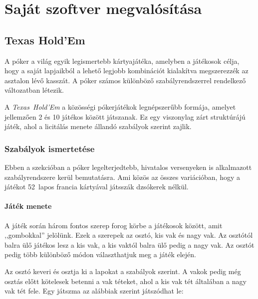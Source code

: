 \documentclass[]{thesis-ekf}
\theoremstyle{definition}
\theoremstyle{remark}
\begin{document}
\chapter{Saját szoftver megvalósítása}

\section{Texas Hold'Em}

A póker a világ egyik legismertebb kártyajátéka, amelyben a játékosok célja, hogy a saját lapjaikból a lehető legjobb kombinációt kialakítva megszerezzék az asztalon lévő kasszát. A póker számos különböző szabályrendszerrel rendelkező változatban létezik.

A \emph{Texas~Hold’Em} a közösségi pókerjátékok legnépszerűbb formája, amelyet jellemzően 2 és 10 játékos között játszanak. Ez egy viszonylag zárt struktúrájú játék, ahol a licitálás menete állandó szabályok szerint zajlik.

\subsection{Szabályok ismertetése}
\label{subsec-pokerszabalyok}

Ebben a szekcióban a póker legelterjedtebb, hivatalos versenyeken is alkalmazott szabályrendszere kerül bemutatásra. Ami közös az összes variációban, hogy a játékot 52~lapos francia kártyával játsszák dzsókerek nélkül.

\subsubsection{Játék menete}

A játék során három fontos szerep forog körbe a játékosok között, amit ,,gombokkal'' jelölünk. Ezek a szerepek az osztó, kis vak és nagy vak. Az osztótól balra ülő játékos lesz a kis vak, a kis vaktól balra ülő pedig a nagy vak. Az osztót pedig több különböző módon választhatjuk meg a játék elején.  

Az osztó keveri és osztja ki a lapokat a szabályok szerint. A vakok pedig még osztás előtt kötelesek betenni a vak téteket, ahol a kis vak tét általában a nagy vak tét fele. Egy játszma az alábbiak szerint játszódhat le: \cite{TexasholdemSzabalyok}
\end{document}

